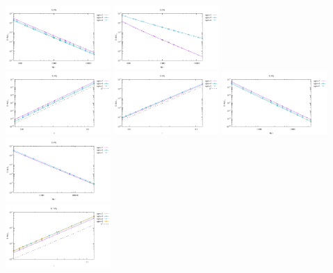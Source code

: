 \begin{center}
\includegraphics[width=4cm]{python_codes/fieldstone_120/results/Q2Q1-velocity-Nfem.pdf}
\includegraphics[width=4cm]{python_codes/fieldstone_120/results/Q2Q1-pressure-Nfem.pdf}
\\
\includegraphics[width=4cm]{python_codes/fieldstone_120/results/Q3Q2-velocity-h.pdf}
\includegraphics[width=4cm]{python_codes/fieldstone_120/results/Q3Q2-pressure-h.pdf}
\includegraphics[width=4cm]{python_codes/fieldstone_120/results/Q3Q2-velocity-Nfem.pdf}
\includegraphics[width=4cm]{python_codes/fieldstone_120/results/Q3Q2-pressure-Nfem.pdf}
\\
\includegraphics[width=4cm]{python_codes/fieldstone_120/results/Q1+Q1-velocity-h.pdf}

\end{center}

